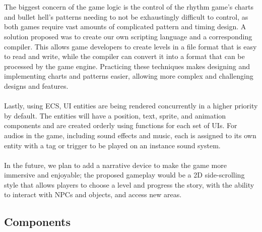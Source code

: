 \\\\
The biggest concern of the game logic is the control of the rhythm game's charts and bullet hell's patterns
needing to not be exhaustingly difficult to control, as both games require vast amounts of complicated pattern and timing design.
A solution proposed was to create our own scripting language and a corresponding compiler.
This allows game developers to create levels in a file format that is easy to read and write,
while the compiler can convert it into a format that can be processed by the game engine.
Practicing these techniques makes designing and implementing charts and patterns easier,
allowing more complex and challenging designs and features.
\\\\
Lastly, using ECS, UI entities are being rendered concurrently in a higher priority by default.
The entities will have a position, text, sprite, and animation components and are created orderly using functions for each set of UIs.
For audios in the game, including sound effects and music, each is assigned to its own entity with a tag or trigger to be played on an instance sound system.
\\\\
In the future, we plan to add a narrative device to make the game more immersive and enjoyable;
the proposed gameplay would be a 2D side-scrolling style that allows players to choose a level and progress the story,
with the ability to interact with NPCs and objects, and access new areas.

\subsection{Components}
\label{subsec:components}

